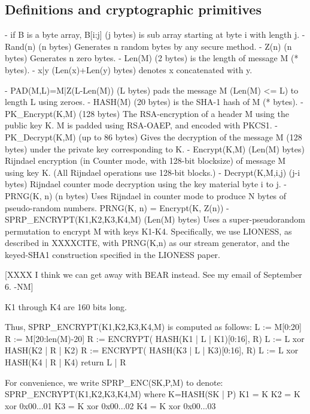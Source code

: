 \subsection{Definitions and cryptographic primitives}

- if B is a byte array, B[i:j] (j bytes) is sub array starting at 
  byte i with length j.
- Rand(n) (n bytes) Generates n random bytes by any secure method.
- Z(n) (n bytes) Generates n zero bytes.
- Len(M) (2 bytes) is the length of message M (* bytes).
- x|y (Len(x)+Len(y) bytes) denotes x concatenated with y.

- PAD(M,L)=M|Z(L-Len(M)) (L bytes) pads the message M (Len(M) <= L)
  to length L using zeroes.
- HASH(M) (20 bytes) is the SHA-1 hash of M (* bytes).
- PK_Encrypt(K,M) (128 bytes) The RSA-encryption of a header M 
  using the public key K.  M is padded using RSA-OAEP, and encoded
  with PKCS1.
- PK_Decrypt(K,M) (up to 86 bytes) Gives the decryption of the
  message M (128 bytes) under the private key corresponding to K.
- Encrypt(K,M) (Len(M) bytes) Rijndael encryption (in Counter mode,
  with 128-bit blocksize) of message M using key K.  (All Rijndael
  operations use 128-bit blocks.)
- Decrypt(K,M,i,j) (j-i bytes) Rijndael counter mode decryption 
  using the key material byte i to j.
- PRNG(K, n) (n bytes) Uses Rijndael in counter mode to produce N
  bytes of pseudo-random numbers.
  PRNG(K, n) = Encrypt(K, Z(n))
- SPRP_ENCRYPT(K1,K2,K3,K4,M) (Len(M) bytes) Uses a super-pseudorandom
  permutation to encrypt M with keys K1-K4.  Specifically, we use LIONESS,
  as described in XXXXCITE, with PRNG(K,n) as our stream generator,
  and the keyed-SHA1 construction specified in the LIONESS paper.

  [XXXX I think we can get away with BEAR instead.  See my email of
    September 6. -NM]

  K1 through K4 are 160 bits long.

  Thus, SPRP_ENCRYPT(K1,K2,K3,K4,M) is computed as follows:
            L := M[0:20]
            R := M[20:len(M)-20]
            R := ENCRYPT( HASH(K1 | L | K1)[0:16], R)
            L := L xor HASH(K2 | R | K2)
            R := ENCRYPT( HASH(K3 | L | K3)[0:16], R)
            L := L xor HASH(K4 | R | K4) 
            return L | R

  For convenience, we write SPRP_ENC(SK,P,M) to denote:
       SPRP_ENCRYPT(K1,K2,K3,K4,M)
       where K=HASH(SK | P)
             K1 = K
             K2 = K xor 0x00...01
             K3 = K xor 0x00...02
             K4 = K xor 0x00...03

